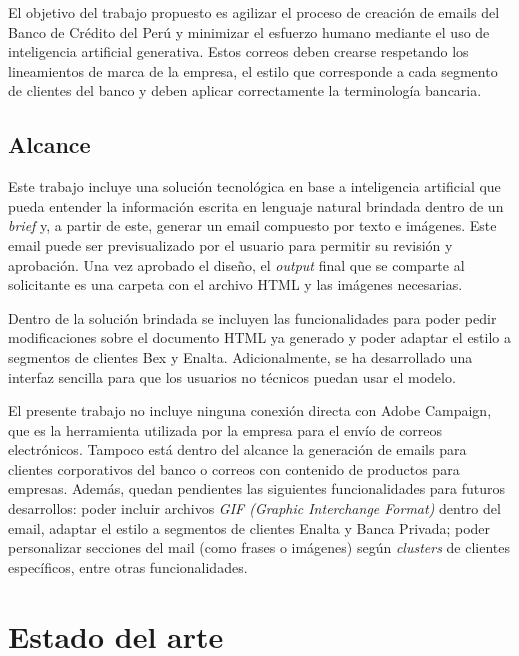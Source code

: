 El objetivo del trabajo propuesto es agilizar el proceso de creación de emails del Banco de Crédito del Perú y minimizar el esfuerzo humano mediante el uso de inteligencia artificial generativa. Estos correos deben crearse respetando los lineamientos de marca de la empresa, el estilo que corresponde a cada segmento de clientes del banco y deben aplicar correctamente la terminología bancaria.

\subsection{Alcance}

Este trabajo incluye una solución tecnológica en base a inteligencia artificial que pueda entender la información escrita en lenguaje natural brindada dentro de un \textit{brief} y, a partir de este, generar un email compuesto por texto e imágenes. Este email puede ser previsualizado por el usuario para permitir su revisión y aprobación. Una vez aprobado el diseño, el \textit{output} final que se comparte al solicitante es una carpeta con el archivo HTML y las imágenes necesarias.

Dentro de la solución brindada se incluyen las funcionalidades para poder pedir modificaciones sobre el documento HTML ya generado y poder adaptar el estilo a segmentos de clientes Bex y Enalta. Adicionalmente, se ha desarrollado una interfaz sencilla para que los usuarios no técnicos puedan usar el modelo.

El presente trabajo no incluye ninguna conexión directa con Adobe Campaign, que es la herramienta utilizada por la empresa para el envío de correos electrónicos. Tampoco está dentro del alcance la generación de emails para clientes corporativos del banco o correos con contenido de productos para empresas. Además, quedan pendientes las siguientes funcionalidades para futuros desarrollos: poder incluir archivos \textit{GIF (Graphic Interchange Format)} dentro del email, adaptar el estilo a segmentos de clientes Enalta y Banca Privada; poder personalizar secciones del mail (como frases o imágenes) según \textit{clusters} de clientes específicos, entre otras funcionalidades.


\section{Estado del arte}

